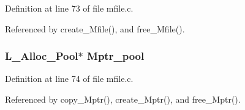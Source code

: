 Definition at line 73 of file mfile.c.

Referenced by create\_\-Mfile(), and free\_\-Mfile().
\subsubsection{\setlength{\rightskip}{0pt plus 5cm}\bf{L\_\-Alloc\_\-Pool}$\ast$ \bf{Mptr\_\-pool}}\label{mfile_8h_1516aa853d883bc45fa7834d030050f5}




Definition at line 74 of file mfile.c.

Referenced by copy\_\-Mptr(), create\_\-Mptr(), and free\_\-Mptr().